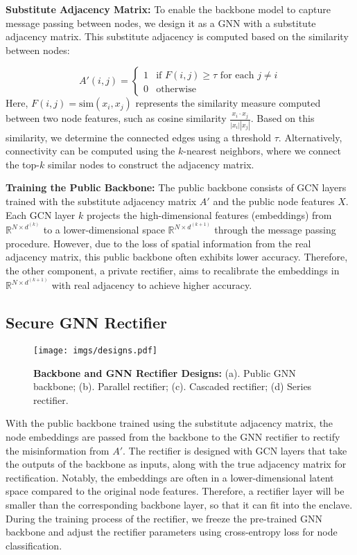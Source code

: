 \noindent\textbf{Substitute Adjacency Matrix:}
To enable the backbone model to capture message passing between nodes, we design it as a GNN with a substitute adjacency matrix. This substitute adjacency is computed based on the similarity between nodes:

{\footnotesize
\begin{equation}
    A'(i, j) = 
\begin{cases}
1 & \text{if } F(i, j)\geq\tau \text{ for each } j \neq i \\
0 & \text{otherwise}
\end{cases}
\end{equation}}Here, $F(i, j) = \text{sim}(x_i, x_j)$ represents the similarity measure computed between two node features, such as cosine similarity $\frac{x_i \cdot x_j}{|x_i||x_j|}$. Based on this similarity, we determine the connected edges using a threshold $\tau$. Alternatively, connectivity can be computed using the $k$-nearest neighbors, where we connect the top-$k$ similar nodes to construct the adjacency matrix.

\noindent\textbf{Training the Public Backbone:}
The public backbone consists of GCN layers trained with the substitute adjacency matrix $A'$ and the public node features $X$. Each GCN layer $k$ projects the high-dimensional features (embeddings) from $\mathbb{R}^{N \times d^{(k)}}$ to a lower-dimensional space $\mathbb{R}^{N \times d^{(k+1)}}$ through the message passing procedure. However, due to the loss of spatial information from the real adjacency matrix, this public backbone often exhibits lower accuracy. Therefore, the other component, a private rectifier, aims to recalibrate the embeddings in $\mathbb{R}^{N \times d^{(k+1)}}$ with real adjacency to achieve higher accuracy.


\subsection{Secure GNN Rectifier} \label{method: rectifier}

\begin{figure}[t]
    \centering
    \texttt{[image: imgs/designs.pdf]}
    \caption{\textbf{Backbone and GNN Rectifier Designs:} (a). Public GNN backbone; (b). Parallel rectifier; (c). Cascaded rectifier; (d) Series rectifier.}
    \label{fig: designs}
    \vspace{-3mm}
\end{figure}

With the public backbone trained using the substitute adjacency matrix, the node embeddings
are passed from the backbone to the GNN rectifier to rectify the misinformation from $A'$.
The rectifier is designed with GCN layers that take the outputs of the backbone as inputs, along with the true adjacency matrix for rectification. 
Notably, the embeddings are often in a lower-dimensional latent space compared to the original node features. 
Therefore, a rectifier layer will be smaller than the corresponding backbone layer, so that it can fit into the enclave. 
During the training process of the rectifier, we freeze the pre-trained GNN backbone and adjust the rectifier parameters using cross-entropy loss for node classification.

